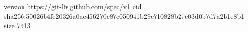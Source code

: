 version https://git-lfs.github.com/spec/v1
oid sha256:50026b4fe20326a0ae456270c87c050941b29c710828b27c03d0b7d7a2b1e8b1
size 7413
